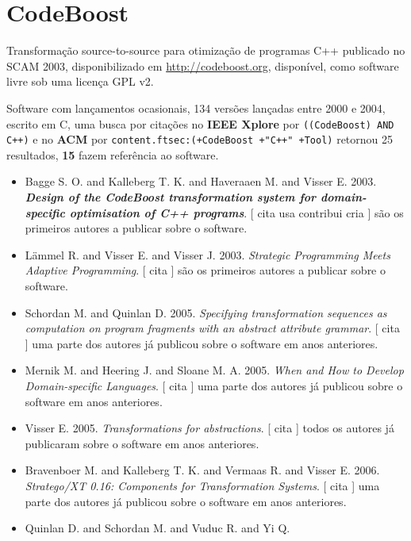 \section{CodeBoost}

Transformação source-to-source para otimização de programas C++
publicado no SCAM 2003,
disponibilizado em \url{http://codeboost.org},
disponível,
como software livre
sob uma licença GPL v2.

Software com lançamentos ocasionais,
134 versões lançadas
entre 2000 e 2004,
escrito em C,
uma busca por citações no {\bf IEEE Xplore} por
\texttt{((CodeBoost) AND C++)}
e no {\bf ACM} por
\texttt{content.ftsec:(+CodeBoost +"C++" +Tool)}
retornou
25 resultados,
{\bf 15} fazem referência ao software.

\begin{itemize}
\item Bagge S. O. and Kalleberg T. K. and Haveraaen M. and Visser E.
      2003.
        \textbf{\textit{ Design of the CodeBoost transformation system for domain-specific optimisation of C++ programs}}.
      [
          cita
          usa
          contribui
          cria
      ]
são os primeiros autores a publicar sobre o software.
\item L\"{a}mmel R. and Visser E. and Visser J.
      2003.
        \textit{ Strategic Programming Meets Adaptive Programming}.
      [
          cita
      ]
são os primeiros autores a publicar sobre o software.
\item Schordan M. and Quinlan D.
      2005.
        \textit{ Specifying transformation sequences as computation on program fragments with an abstract attribute grammar}.
      [
          cita
      ]
uma parte dos autores já publicou sobre o software em anos anteriores.
\item Mernik M. and Heering J. and Sloane M. A.
      2005.
        \textit{ When and How to Develop Domain-specific Languages}.
      [
          cita
      ]
uma parte dos autores já publicou sobre o software em anos anteriores.
\item Visser E.
      2005.
        \textit{ Transformations for abstractions}.
      [
          cita
      ]
todos os autores já publicaram sobre o software em anos anteriores.
\item Bravenboer M. and Kalleberg T. K. and Vermaas R. and Visser E.
      2006.
        \textit{ Stratego/XT 0.16: Components for Transformation Systems}.
      [
          cita
      ]
uma parte dos autores já publicou sobre o software em anos anteriores.
\item Quinlan D. and Schordan M. and Vuduc R. and Yi Q.

\end{itemize}
